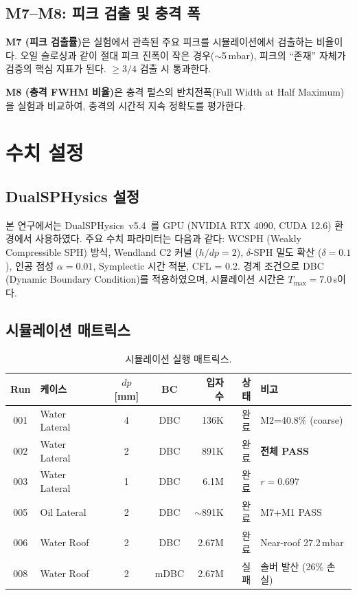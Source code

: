 \documentclass[11pt]{article}
\begin{document}
\subsection{M7--M8: 피크 검출 및 충격 폭} \label{sec:m7-m8}

\textbf{M7 (피크 검출률)}은 실험에서 관측된 주요 피크를 시뮬레이션에서 검출하는 비율이다.
오일 슬로싱과 같이 절대 피크 진폭이 작은 경우($\sim$5\,mbar), 피크의 ``존재''
자체가 검증의 핵심 지표가 된다. $\geq 3/4$ 검출 시 통과한다.

\textbf{M8 (충격 FWHM 비율)}은 충격 펄스의 반치전폭(Full Width at Half Maximum)을
실험과 비교하여, 충격의 시간적 지속 정확도를 평가한다.


\section{수치 설정} \label{sec:setup}
\setcounter{equation}{0}

\subsection{DualSPHysics 설정} \label{sec:config}

본 연구에서는 DualSPHysics~v5.4~\cite{Dominguez2022}를 GPU (NVIDIA RTX 4090,
CUDA 12.6) 환경에서 사용하였다.
주요 수치 파라미터는 다음과 같다:
WCSPH (Weakly Compressible SPH) 방식, Wendland C2 커널 ($h/dp = 2$),
$\delta$-SPH 밀도 확산 ($\delta = 0.1$), 인공 점성 $\alpha = 0.01$,
Symplectic 시간 적분, CFL = 0.2.
경계 조건으로 DBC (Dynamic Boundary Condition)를 적용하였으며,
시뮬레이션 시간은 $T_\text{max} = 7.0$\,s이다.


\subsection{시뮬레이션 매트릭스} \label{sec:runs}

\begin{table}[H]
\caption{시뮬레이션 실행 매트릭스.}
\label{tab:runs}
\centering
\begin{tabular}{@{}clccrrl@{}}
\toprule
Run & 케이스 & $dp$ [mm] & BC & 입자 수 & 상태 & 비고 \\
\midrule
001 & Water Lateral & 4 & DBC & 136K & 완료 & M2=40.8\% (coarse) \\
002 & Water Lateral & 2 & DBC & 891K & 완료 & \textbf{전체 PASS} \\
003 & Water Lateral & 1 & DBC & 6.1M & 완료 & $r=0.697$ \\
005 & Oil Lateral & 2 & DBC & $\sim$891K & 완료 & M7+M1 PASS \\
006 & Water Roof & 2 & DBC & 2.67M & 완료 & Near-roof 27.2\,mbar \\
008 & Water Roof & 2 & mDBC & 2.67M & 실패 & 솔버 발산 (26\% 손실) \\
\bottomrule
\end{tabular}
\end{table}
\end{document}
